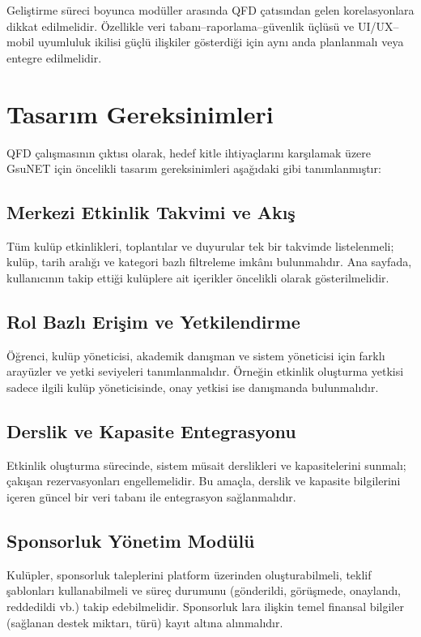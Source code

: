 \documentclass[a4paper,12pt]{report}
\begin{document}
Geliştirme süreci boyunca modüller arasında QFD çatısından gelen korelasyonlara dikkat edilmelidir. Özellikle veri tabanı–raporlama–güvenlik üçlüsü ve UI/UX–mobil uyumluluk ikilisi güçlü ilişkiler gösterdiği için aynı anda planlanmalı veya entegre edilmelidir.

\section{Tasarım Gereksinimleri}

QFD çalışmasının çıktısı olarak, hedef kitle ihtiyaçlarını karşılamak üzere GsuNET için öncelikli tasarım gereksinimleri aşağıdaki gibi tanımlanmıştır:

\subsection{Merkezi Etkinlik Takvimi ve Akış}

Tüm kulüp etkinlikleri, toplantılar ve duyurular tek bir takvimde listelenmeli; kulüp, tarih aralığı ve kategori bazlı filtreleme imkânı bulunmalıdır. Ana sayfada, kullanıcının takip ettiği kulüplere ait içerikler öncelikli olarak gösterilmelidir.

\subsection{Rol Bazlı Erişim ve Yetkilendirme}

Öğrenci, kulüp yöneticisi, akademik danışman ve sistem yöneticisi için farklı arayüzler ve yetki seviyeleri tanımlanmalıdır. Örneğin etkinlik oluşturma yetkisi sadece ilgili kulüp yöneticisinde, onay yetkisi ise danışmanda bulunmalıdır.

\subsection{Derslik ve Kapasite Entegrasyonu}

Etkinlik oluşturma sürecinde, sistem müsait derslikleri ve kapasitelerini sunmalı; çakışan rezervasyonları engellemelidir. Bu amaçla, derslik ve kapasite bilgilerini içeren güncel bir veri tabanı ile entegrasyon sağlanmalıdır.

\subsection{Sponsorluk Yönetim Modülü}

Kulüpler, sponsorluk taleplerini platform üzerinden oluşturabilmeli, teklif şablonları kullanabilmeli ve süreç durumunu (gönderildi, görüşmede, onaylandı, reddedildi vb.) takip edebilmelidir. Sponsorluk lara ilişkin temel finansal bilgiler (sağlanan destek miktarı, türü) kayıt altına alınmalıdır.
\end{document}
